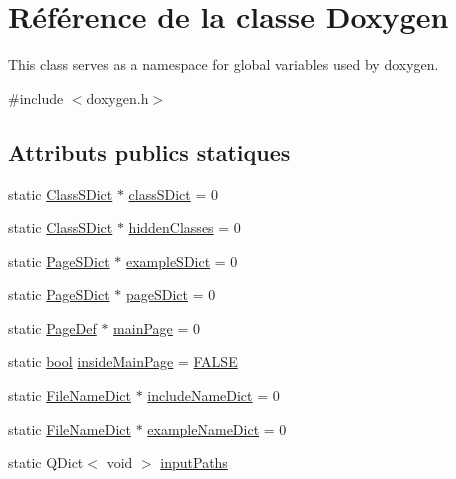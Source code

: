 \hypertarget{class_doxygen}{}\section{Référence de la classe Doxygen}
\label{class_doxygen}


This class serves as a namespace for global variables used by doxygen.  




{\ttfamily \#include $<$doxygen.\+h$>$}

\subsection*{Attributs publics statiques}
\begin{DoxyCompactItemize}
\item 
static \hyperlink{class_class_s_dict}{Class\+S\+Dict} $\ast$ \hyperlink{class_doxygen_a707a44cf6887311937ada7bb7e4ffcc7}{class\+S\+Dict} = 0
\item 
static \hyperlink{class_class_s_dict}{Class\+S\+Dict} $\ast$ \hyperlink{class_doxygen_a95780a9acf96cd8425ab0553fda0a67d}{hidden\+Classes} = 0
\item 
static \hyperlink{class_page_s_dict}{Page\+S\+Dict} $\ast$ \hyperlink{class_doxygen_a3db39033e7dfb6816406c9c01679150a}{example\+S\+Dict} = 0
\item 
static \hyperlink{class_page_s_dict}{Page\+S\+Dict} $\ast$ \hyperlink{class_doxygen_a0a33d9d9e74d16418a37d67faf0315a3}{page\+S\+Dict} = 0
\item 
static \hyperlink{class_page_def}{Page\+Def} $\ast$ \hyperlink{class_doxygen_ab02c8d98cdc6b4bf1d81a0b0cf4b4ecb}{main\+Page} = 0
\item 
static \hyperlink{qglobal_8h_a1062901a7428fdd9c7f180f5e01ea056}{bool} \hyperlink{class_doxygen_a419b27a523ea0261e58103f998c68a12}{inside\+Main\+Page} = \hyperlink{qglobal_8h_a10e004b6916e78ff4ea8379be80b80cc}{F\+A\+L\+S\+E}
\item 
static \hyperlink{class_file_name_dict}{File\+Name\+Dict} $\ast$ \hyperlink{class_doxygen_a84c9e6834fd53dff0fc4147f14a40a07}{include\+Name\+Dict} = 0
\item 
static \hyperlink{class_file_name_dict}{File\+Name\+Dict} $\ast$ \hyperlink{class_doxygen_a77552f91ab849bf1c0a6854b081f4aca}{example\+Name\+Dict} = 0
\item 
static Q\+Dict$<$ void $>$ \hyperlink{class_doxygen_a26b352ec2f04a5f8e35411a8a28a5850}{input\+Paths}
\item 

\end{DoxyCompactItemize}

